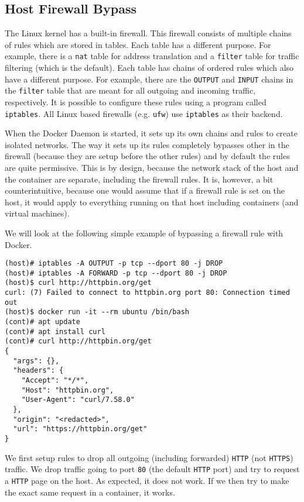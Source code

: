 \subsection{Host Firewall Bypass}
The Linux kernel has a built-in firewall. This firewall consists of multiple chains of rules which are stored in tables. Each table has a different purpose. For example, there is a \lstinline{nat} table for address translation and a \lstinline{filter} table for traffic filtering (which is the default).
Each table has chains of ordered rules which also have a different purpose. For example, there are the \lstinline{OUTPUT} and \lstinline{INPUT} chains in the \lstinline{filter} table that are meant for all outgoing and incoming traffic, respectively.
It is possible to configure these rules using a program called \lstinline{iptables}. All Linux based firewalls (e.g. \lstinline{ufw}) use \lstinline{iptables} as their backend.

\hfill

When the Docker Daemon is started, it sets up its own chains and rules to create isolated networks. The way it sets up its rules completely bypasses other in the firewall (because they are setup before the other rules) and by default the rules are quite permissive. This is by design, because the network stack of the host and the container are separate, including the firewall rules. It is, however, a bit counterintuitive, because one would assume that if a firewall rule is set on the host, it would apply to everything running on that host including containers (and virtual machines).

\hfill

We will look at the following simple example of bypassing a firewall rule with Docker.

\begin{lstlisting}
(host)# iptables -A OUTPUT -p tcp --dport 80 -j DROP
(host)# iptables -A FORWARD -p tcp --dport 80 -j DROP
(host)$ curl http://httpbin.org/get
curl: (7) Failed to connect to httpbin.org port 80: Connection timed out
(host)$ docker run -it --rm ubuntu /bin/bash
(cont)# apt update
(cont)# apt install curl
(cont)# curl http://httpbin.org/get
{
  "args": {},
  "headers": {
    "Accept": "*/*",
    "Host": "httpbin.org",
    "User-Agent": "curl/7.58.0"
  },
  "origin": "<redacted>",
  "url": "https://httpbin.org/get"
}
\end{lstlisting}

We first setup rules to drop all outgoing (including forwarded) \lstinline{HTTP} (not \lstinline{HTTPS}) traffic. We drop traffic going to port \lstinline{80} (the default \lstinline{HTTP} port) and try to request a \lstinline{HTTP} page on the host. As expected, it does not work. If we then try to make the exact same request in a container, it works.

